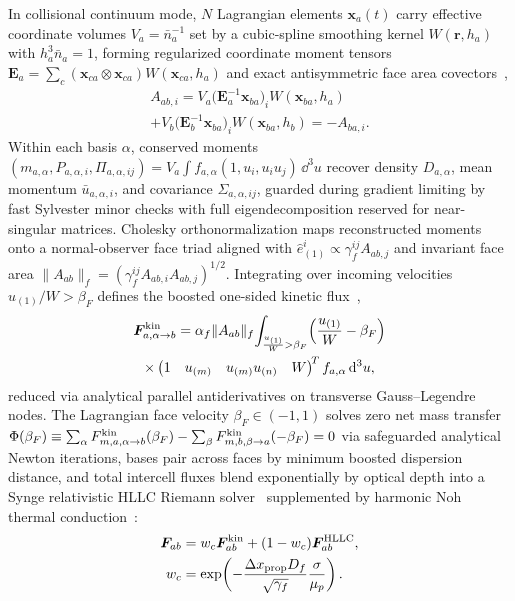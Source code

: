 In collisional continuum mode, $N$ Lagrangian elements $\bm{x}_a(t)$ carry effective coordinate volumes $V_a = \bar{n}_a^{-1}$ set by a cubic-spline smoothing kernel $W(\bm{r}, h_a)$ with $h_a^3 \bar{n}_a = 1$, forming regularized coordinate moment tensors $\bm{E}_a = \sum_c (\bm{x}_{ca}\otimes\bm{x}_{ca})W(\bm{x}_{ca},h_a)$ and exact antisymmetric face area covectors~\cite{Hopkins:2015mfc,Hopkins:2026lbv},
\begin{multline}\label{eq:mfm_faces}
A_{ab,i} = V_a\bigl(\bm{E}_a^{-1}\bm{x}_{ba}\bigr)_i W(\bm{x}_{ba}, h_a) \\
+ V_b\bigl(\bm{E}_b^{-1}\bm{x}_{ba}\bigr)_i W(\bm{x}_{ba}, h_b) = -A_{ba,i}.
\end{multline}
Within each basis $\alpha$, conserved moments $(m_{a,\alpha}, P_{a,\alpha,i}, \Pi_{a,\alpha,ij}) = V_a\int f_{a,\alpha}(1, u_i, u_i u_j)\,\dd^3 u$ recover density $D_{a,\alpha}$, mean momentum $\bar{u}_{a,\alpha,i}$, and covariance $\Sigma_{a,\alpha,ij}$, guarded during gradient limiting by fast Sylvester minor checks with full eigendecomposition reserved for near-singular matrices. Cholesky orthonormalization maps reconstructed moments onto a normal-observer face triad aligned with $\hat{e}_{(1)}^i \propto \gamma_f^{ij}A_{ab,j}$ and invariant face area $\|A_{ab}\|_f = (\gamma_f^{ij}A_{ab,i}A_{ab,j})^{1/2}$. Integrating over incoming velocities $u_{(1)}/W > \beta_F$ defines the boosted one-sided kinetic flux~\cite{Hopkins:2026lbv},
\begin{multline}\label{eq:onesided_flux}
\bm{F}_{a,\alpha\to b}^{\rm kin} = \alpha_f \|A_{ab}\|_f \!\int_{\frac{u_{(1)}}{W} > \beta_F}\!\left(\frac{u_{(1)}}{W} - \beta_F\right) \\
\times \begin{pmatrix} 1 & u_{(m)} & u_{(m)}u_{(n)} & W \end{pmatrix}^{\!T} f_{a,\alpha}\,\mathrm{d}^3 u,
\end{multline}
reduced via analytical parallel antiderivatives on transverse Gauss--Legendre nodes. The Lagrangian face velocity $\beta_F \in (-1, 1)$ solves zero net mass transfer $\Phi(\beta_F) \equiv \sum_\alpha F_{m,a,\alpha\to b}^{\rm kin}(\beta_F) - \sum_\beta F_{m,b,\beta\to a}^{\rm kin}(-\beta_F) = 0$ via safeguarded analytical Newton iterations, bases pair across faces by minimum boosted dispersion distance, and total intercell fluxes blend exponentially by optical depth into a Synge relativistic HLLC Riemann solver~\cite{Mignone:2005ns} supplemented by harmonic Noh thermal conduction~\cite{Noh:1987}:
\begin{align}\label{eq:ap_blend}
\bm{F}_{ab} &= w_c \bm{F}_{ab}^{\rm kin} + (1 - w_c)\bm{F}_{ab}^{\rm HLLC}, \nonumber\\
w_c &= \exp\!\left(-\frac{\Delta x_{\rm prop} D_f}{\sqrt{\gamma_f}}\frac{\sigma}{\mu_p}\right).
\end{align}

